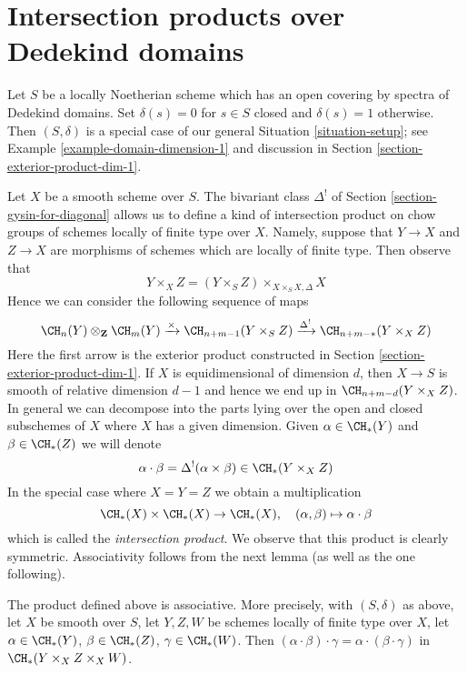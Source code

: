 \section{Intersection products over Dedekind domains}
\label{section-intersection-product-dim-1}

\noindent
Let $S$ be a locally Noetherian scheme which has an open covering
by spectra of Dedekind domains. Set $\delta(s) = 0$ for $s \in S$ closed
and $\delta(s) = 1$ otherwise. Then $(S, \delta)$ is a special case of our
general Situation \ref{situation-setup}; see
Example \ref{example-domain-dimension-1} and discussion in
Section \ref{section-exterior-product-dim-1}.

\medskip\noindent
Let $X$ be a smooth scheme over $S$. The bivariant class $\Delta^!$
of Section \ref{section-gysin-for-diagonal} allows us to define a kind of
intersection product on chow groups of schemes locally of finite type over $X$.
Namely, suppose that $Y \to X$ and $Z \to X$ are morphisms of schemes
which are locally of finite type. Then observe that
$$
Y \times_X Z =  (Y \times_S Z) \times_{X \times_S X, \Delta} X
$$
Hence we can consider the following sequence of maps
$$
\CH_n(Y) \otimes_\mathbf{Z} \CH_m(Y)
\xrightarrow{\times}
\CH_{n + m - 1}(Y \times_S Z)
\xrightarrow{\Delta^!}
\CH_{n + m - *}(Y \times_X Z)
$$
Here the first arrow is the exterior product constructed in
Section \ref{section-exterior-product-dim-1}. If $X$ is equidimensional
of dimension $d$, then $X \to S$ is smooth of relative dimension $d - 1$
and hence we end up in $\CH_{n + m - d}(Y \times_X Z)$.
In general we can decompose into the parts lying over the open
and closed subschemes of $X$ where $X$ has a given dimension.
Given $\alpha \in \CH_*(Y)$ and $\beta \in \CH_*(Z)$ we will denote
$$
\alpha \cdot \beta = \Delta^!(\alpha \times \beta)
\in \CH_*(Y \times_X Z)
$$
In the special case where $X = Y = Z$ we obtain a multiplication
$$
\CH_*(X) \times \CH_*(X) \to \CH_*(X),\quad
(\alpha, \beta) \mapsto \alpha \cdot \beta
$$
which is called the {\it intersection product}. We observe that
this product is clearly symmetric. Associativity follows from
the next lemma (as well as the one following).

\begin{lemma}
\label{lemma-associative-dim-1}
The product defined above is associative. More precisely, with
$(S, \delta)$ as above, let $X$ be smooth over $S$,
let $Y, Z, W$ be schemes locally of finite type over $X$, let
$\alpha \in \CH_*(Y)$, $\beta \in \CH_*(Z)$, $\gamma \in \CH_*(W)$.
Then $(\alpha \cdot \beta) \cdot \gamma =
\alpha \cdot (\beta \cdot \gamma)$ in $\CH_*(Y \times_X Z \times_X W)$.
\end{lemma}

